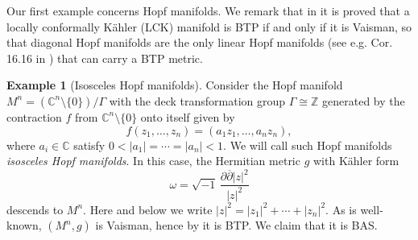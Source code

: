 \documentclass{amsart}
\numberwithin{equation}{section}
\theoremstyle{definition}
\newtheorem{example}  [theorem]     {Example}
\renewcommand{\1}{\mathds{1}}
\renewcommand{\>}{\rightarrow}
\begin{document}
Our first example concerns Hopf manifolds. We remark that in \cite{AV} it is proved that a locally conformally K\"ahler (LCK) manifold is {\rm BTP} if and only if it is Vaisman, so that diagonal Hopf manifolds are the only linear Hopf manifolds (see e.g. Cor. 16.16 in \cite{OV}) that can carry a {\rm BTP} metric.
\begin{example}[Isosceles Hopf manifolds] Consider the Hopf manifold $M^n=({\mathbb C}^n\setminus \{ 0\})/ \Gamma $ with the deck transformation group $\Gamma \cong {\mathbb Z}$ generated by the contraction $f$ from ${\mathbb C}^n\setminus \{ 0\}$ onto itself given by
$$f(z_1, \ldots , z_n) = ( a_1z_1, \ldots , a_nz_n),  $$
where $a_i\in\mathbb C$ satisfy $0<|a_1|=\cdots =|a_n|<1$. We will call such Hopf manifolds {\em isosceles  Hopf manifolds}. In this case, the Hermitian metric $g$ with K\"ahler form
$$ \omega = \sqrt{-1} \, \frac{ \partial \overline{\partial} |z|^2}{|z|^2}  $$
descends to $M^n$. Here and below we write $|z|^2=|z_1|^2 + \cdots + |z_n|^2$. As  is well-known, $(M^n,g)$ is Vaisman, hence by \cite{AV} it is BTP. We claim that it is BAS.


\end{example}
\end{document}
